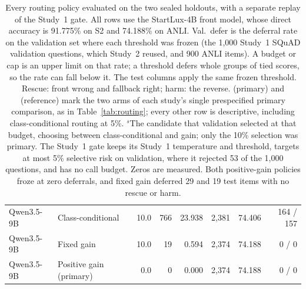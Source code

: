 \documentclass[11pt]{article}
\begin{document}
\begin{table}[t]
\begin{tabular}{llrrrrrr}
Qwen3.5-9B & Class-conditional & 10.0 & 766 & 23.938 & 2,381 & 74.406 & 164 / 157 \\
Qwen3.5-9B & Fixed gain & 10.0 & 19 & 0.594 & 2,374 & 74.188 & 0 / 0 \\
Qwen3.5-9B & Positive gain (primary) & 0.0 & 0 & 0.000 & 2,374 & 74.188 & 0 / 0 \\
\bottomrule
\end{tabular}
\caption{Every routing policy evaluated on the two sealed holdouts, with a separate replay of the Study~1 gate. All rows use the StartLux-4B front model, whose direct accuracy is 91.775\% on S2 and 74.188\% on ANLI. Val.\ defer is the deferral rate on the validation set where each threshold was frozen (the 1,000 Study~1 SQuAD validation questions, which Study~2 reused, and 900 ANLI items). A budget or cap is an upper limit on that rate; a threshold defers whole groups of tied scores, so the rate can fall below it. The test columns apply the same frozen threshold. Rescue: front wrong and fallback right; harm: the reverse. (primary) and (reference) mark the two arms of each study's single prespecified primary comparison, as in Table~\ref{tab:routing}; every other row is descriptive, including class-conditional routing at 5\%. $^{s}$The candidate that validation selected at that budget, choosing between class-conditional and gain; only the 10\% selection was primary. The Study~1 gate keeps its Study~1 temperature and threshold, targets at most 5\% selective risk on validation, where it rejected 53 of the 1,000 questions, and has no call budget. Zeros are measured. Both positive-gain policies froze at zero deferrals, and fixed gain deferred 29 and 19 test items with no rescue or harm.}
\label{tab:allrouting}
\end{table}

\begin{table}[h]
\centering
\small
\setlength{\tabcolsep}{3pt}
\caption{Study~1 cascade accuracy (\%) with $k$ deferrals to Qwen3.5-4B: random routing (expectation), the frozen confidence gate, and the hindsight oracle.}
\label{tab:oracle}
\end{table}
\end{document}
